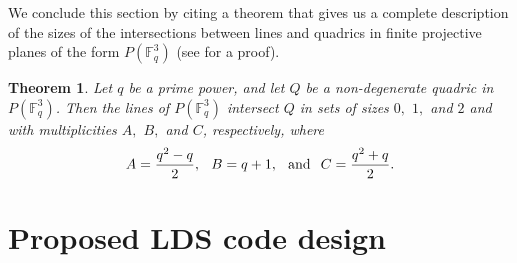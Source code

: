\documentclass[journal,comsoc]{IEEEtran}
\newtheorem{theorem}{Theorem}[section]
\begin{document}
We conclude this section by citing a theorem that gives us a complete description of the sizes of the intersections between lines and quadrics in finite projective planes of the form $P(\mathbb{F}_q^3)$ \cite{Beutelspacher1998} (see \cite{Beutelspacher1998} for a proof)\fi. 
\begin{theorem} \label{intersectthm} Let $q$ be a prime power, and let $Q$ be a non-degenerate quadric in $P(\mathbb{F}_q^3)$. Then the lines of $P(\mathbb{F}_q^3)$ intersect $Q$ in sets of sizes $0,$ $1,$ and $2$ and with multiplicities $A,$ $B,$ and $C$, respectively, where 
\[A = \frac{q^2-q}{2}, \hspace{0.1in} B = q+1, \hspace{0.1in} \text{and} \hspace{0.1in} C = \frac{q^2+q}{2}.\]
\end{theorem}
\vspace{-0.4cm}
\section{Proposed LDS code design}
\label{proposedLDS}
\end{document}
